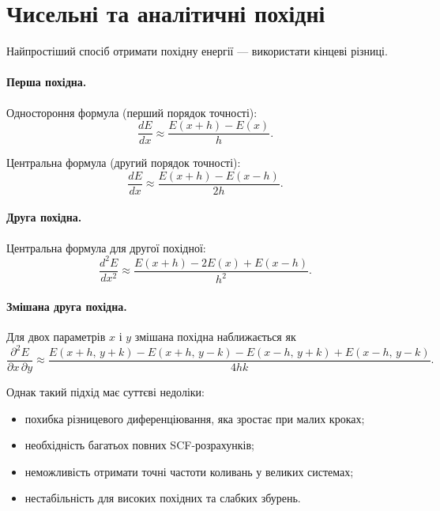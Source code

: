 \documentclass{PySCFBook}
\begin{document}
\section{Чисельні та  аналітичні похідні}

Найпростіший спосіб отримати похідну енергії --- використати кінцеві різниці.

\paragraph{Перша похідна.}

Одностороння формула (перший порядок точності):
\begin{equation}
	\frac{dE}{dx}
	\approx
	\frac{E(x+h)-E(x)}{h}.
	\label{eq:finite_diff_forward}
\end{equation}

Центральна формула (другий порядок точності):
\begin{equation}
	\frac{dE}{dx}
	\approx
	\frac{E(x+h)-E(x-h)}{2h}.
	\label{eq:finite_diff_central_1st}
\end{equation}

\paragraph{Друга похідна.}

Центральна формула для другої похідної:
\begin{equation}
	\frac{d^2E}{dx^2}
	\approx
	\frac{E(x+h)-2E(x)+E(x-h)}{h^2}.
	\label{eq:finite_diff_2nd}
\end{equation}

\paragraph{Змішана друга похідна.}

Для двох параметрів $x$ і $y$ змішана похідна наближається як
\begin{equation}
	\frac{\partial^2 E}{\partial x\,\partial y}
	\approx
	\frac{
		E(x+h,\,y+k)
		-
		E(x+h,\,y-k)
		-
		E(x-h,\,y+k)
		+
		E(x-h,\,y-k)
	}{4hk}.
	\label{eq:finite_diff_mixed}
\end{equation}

Однак такий підхід має суттєві недоліки:

\begin{itemize}
	\item похибка різницевого диференціювання, яка зростає при малих кроках;
	\item необхідність багатьох повних SCF-розрахунків;
	\item неможливість отримати точні частоти коливань у великих системах;
	\item нестабільність для високих похідних та слабких збурень.
\end{itemize}
\end{document}
